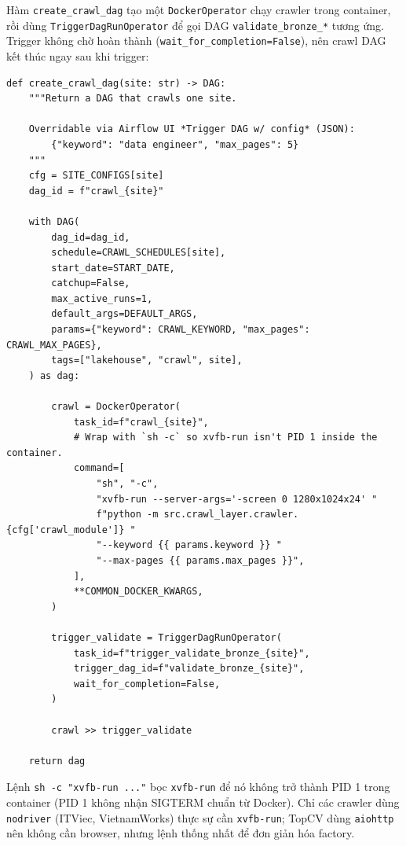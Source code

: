 Hàm \texttt{create\_crawl\_dag} tạo một \texttt{DockerOperator} chạy crawler
trong container, rồi dùng \texttt{TriggerDagRunOperator} để gọi DAG
\texttt{validate\_bronze\_*} tương ứng. Trigger không chờ hoàn thành
(\texttt{wait\_for\_completion=False}), nên crawl DAG kết thúc ngay sau khi
trigger:

\begin{lstlisting}[style=pystyle, caption={create\_crawl\_dag — DockerOperator + TriggerDagRunOperator}]
def create_crawl_dag(site: str) -> DAG:
    """Return a DAG that crawls one site.

    Overridable via Airflow UI *Trigger DAG w/ config* (JSON):
        {"keyword": "data engineer", "max_pages": 5}
    """
    cfg = SITE_CONFIGS[site]
    dag_id = f"crawl_{site}"

    with DAG(
        dag_id=dag_id,
        schedule=CRAWL_SCHEDULES[site],
        start_date=START_DATE,
        catchup=False,
        max_active_runs=1,
        default_args=DEFAULT_ARGS,
        params={"keyword": CRAWL_KEYWORD, "max_pages": CRAWL_MAX_PAGES},
        tags=["lakehouse", "crawl", site],
    ) as dag:

        crawl = DockerOperator(
            task_id=f"crawl_{site}",
            # Wrap with `sh -c` so xvfb-run isn't PID 1 inside the container.
            command=[
                "sh", "-c",
                "xvfb-run --server-args='-screen 0 1280x1024x24' "
                f"python -m src.crawl_layer.crawler.{cfg['crawl_module']} "
                "--keyword {{ params.keyword }} "
                "--max-pages {{ params.max_pages }}",
            ],
            **COMMON_DOCKER_KWARGS,
        )

        trigger_validate = TriggerDagRunOperator(
            task_id=f"trigger_validate_bronze_{site}",
            trigger_dag_id=f"validate_bronze_{site}",
            wait_for_completion=False,
        )

        crawl >> trigger_validate

    return dag
\end{lstlisting}

Lệnh \texttt{sh -c "xvfb-run ..."} bọc \texttt{xvfb-run} để nó không trở thành
PID 1 trong container (PID 1 không nhận SIGTERM chuẩn từ Docker). Chỉ các
crawler dùng \texttt{nodriver} (ITViec, VietnamWorks) thực sự cần
\texttt{xvfb-run}; TopCV dùng \texttt{aiohttp} nên không cần browser, nhưng
lệnh thống nhất để đơn giản hóa factory.

